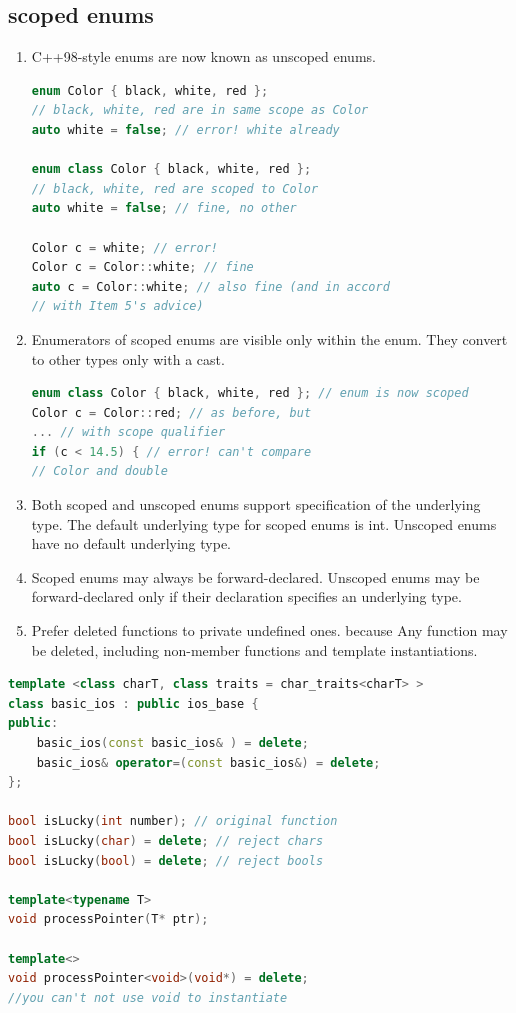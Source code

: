 \documentclass[a4paper,11pt,twoside]{book}
\begin{document}
\subsection{scoped enums}
\begin{enumerate}
\item C++98-style enums are now known as unscoped enums.
\begin{lstlisting}[frame=single, language=c++]
enum Color { black, white, red };
// black, white, red are in same scope as Color
auto white = false; // error! white already

enum class Color { black, white, red };
// black, white, red are scoped to Color
auto white = false; // fine, no other

Color c = white; // error!
Color c = Color::white; // fine
auto c = Color::white; // also fine (and in accord
// with Item 5's advice)
\end{lstlisting}

\item Enumerators of scoped enums are visible only within the enum. They convert
to other types only with a cast.
\begin{lstlisting}[frame=single, language=c++]
enum class Color { black, white, red }; // enum is now scoped
Color c = Color::red; // as before, but
... // with scope qualifier
if (c < 14.5) { // error! can't compare
// Color and double
\end{lstlisting}
\item Both scoped and unscoped enums support specification of the underlying type.
The default underlying type for scoped enums is int. Unscoped enums have no
default underlying type.

\item Scoped enums may always be forward-declared. Unscoped enums may be
forward-declared only if their declaration specifies an underlying type.

\item Prefer deleted functions to private undefined ones. because Any function may be deleted, including non-member functions and template instantiations.
\end{enumerate}



\begin{lstlisting}[frame=single, language=c++]
template <class charT, class traits = char_traits<charT> >
class basic_ios : public ios_base {
public:
	basic_ios(const basic_ios& ) = delete;
	basic_ios& operator=(const basic_ios&) = delete;
};

bool isLucky(int number); // original function
bool isLucky(char) = delete; // reject chars
bool isLucky(bool) = delete; // reject bools

template<typename T>
void processPointer(T* ptr);

template<>
void processPointer<void>(void*) = delete;
//you can't not use void to instantiate
\end{lstlisting} 
\end{document}
